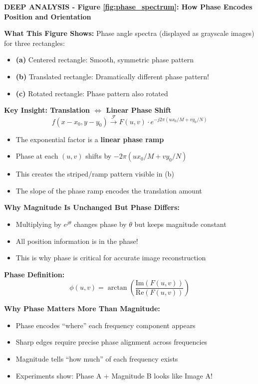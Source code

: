 \documentclass[12pt,a4paper]{article}
\begin{document}
\begin{deepexplanation}
\textbf{DEEP ANALYSIS - Figure \ref{fig:phase_spectrum}: How Phase Encodes Position and Orientation}

\textbf{What This Figure Shows:}
Phase angle spectra (displayed as grayscale images) for three rectangles:
\begin{itemize}
    \item \textbf{(a)} Centered rectangle: Smooth, symmetric phase pattern
    \item \textbf{(b)} Translated rectangle: Dramatically different phase pattern!
    \item \textbf{(c)} Rotated rectangle: Phase pattern also rotated
\end{itemize}

\textbf{Key Insight: Translation $\Leftrightarrow$ Linear Phase Shift}
\[
f(x - x_0, y - y_0) \xrightarrow{\mathcal{F}} F(u, v) \cdot e^{-j2\pi(ux_0/M + vy_0/N)}
\]
\begin{itemize}
    \item The exponential factor is a \textbf{linear phase ramp}
    \item Phase at each $(u, v)$ shifts by $-2\pi(ux_0/M + vy_0/N)$
    \item This creates the striped/ramp pattern visible in (b)
    \item The slope of the phase ramp encodes the translation amount
\end{itemize}

\textbf{Why Magnitude Is Unchanged But Phase Differs:}
\begin{itemize}
    \item Multiplying by $e^{j\theta}$ changes phase by $\theta$ but keeps magnitude constant
    \item All position information is in the phase!
    \item This is why phase is critical for accurate image reconstruction
\end{itemize}

\textbf{Phase Definition:}
\[
\phi(u, v) = \arctan\left(\frac{\text{Im}(F(u, v))}{\text{Re}(F(u, v))}\right)
\]

\textbf{Why Phase Matters More Than Magnitude:}
\begin{itemize}
    \item Phase encodes ``where'' each frequency component appears
    \item Sharp edges require precise phase alignment across frequencies
    \item Magnitude tells ``how much'' of each frequency exists
    \item Experiments show: Phase A + Magnitude B looks like Image A!
\end{itemize}
\end{deepexplanation}
\end{document}

